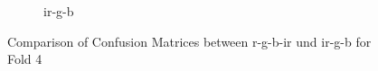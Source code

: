 \begin{figure}[h]
\begin{subfigure}[b]{0.85\textwidth}
        \caption{ir-g-b} %
        \label{fig:cm_irgb} %
    \end{subfigure}
    \caption{Comparison of Confusion Matrices between r-g-b-ir und ir-g-b for Fold 4} %
    \label{fig:combined_maps} %
\end{figure}